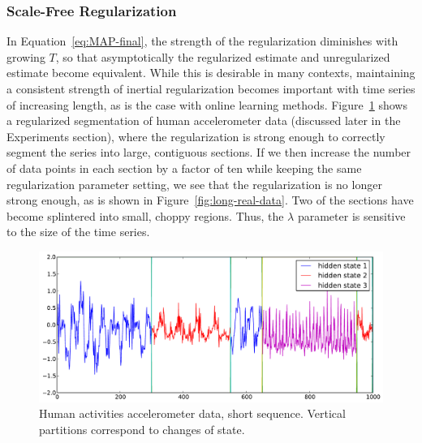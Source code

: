 \documentclass[letterpaper]{article}
\begin{document}
\subsubsection{Scale-Free Regularization}
\vspace{-0.1cm}
In Equation~\ref{eq:MAP-final}, the strength of the regularization diminishes
with growing $T$, so that asymptotically the regularized estimate and
unregularized estimate become equivalent. While this is desirable in many
contexts, maintaining a consistent strength of inertial regularization becomes
important with time series of increasing length, as is the case with online
learning methods. Figure~\ref{fig:short-real-data} shows a regularized
segmentation of human accelerometer data (discussed later in the Experiments
section), where the regularization is strong enough to correctly segment the
series into large, contiguous sections. If we then increase the number of data
points in each section by a factor of ten while keeping the same regularization
parameter setting, we see that the regularization is no longer strong enough, as
is shown in Figure~\ref{fig:long-real-data}. Two of the sections have become
splintered into small, choppy regions. Thus, the $\lambda$ parameter is
sensitive to the size of the time series.

\vspace{-0.1cm}
\begin{figure}[htbp]
  \centering
    \includegraphics[width=0.8\linewidth]{images/MAP_results_hard_activity_short_3_states.pdf}
      \vspace{-0.5cm}
  \caption{\small{Human activities accelerometer data, short sequence. Vertical
  partitions correspond to changes of state.}}
  \vspace{-0.1cm}
  \label{fig:short-real-data}  
\end{figure}
\end{document}

